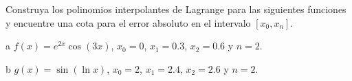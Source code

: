 \begin{statement}{4}
  Construya los polinomios interpolantes de Lagrange para las siguientes
  funciones y encuentre una cota para el error absoluto en el intervalo
  $[x_0, x_n]$.
\end{statement}

\begin{statement}{a}
  $f(x) = e^{2x} \cos(3x)$, $x_0 = 0$, $x_1 = 0.3$, $x_2 = 0.6$ y $n = 2$.
\end{statement}

\begin{statement}{b}
  $g(x) = \sin(\ln x)$, $x_0 = 2$, $x_1 = 2.4$, $x_2 = 2.6$ y $n = 2$.
\end{statement}